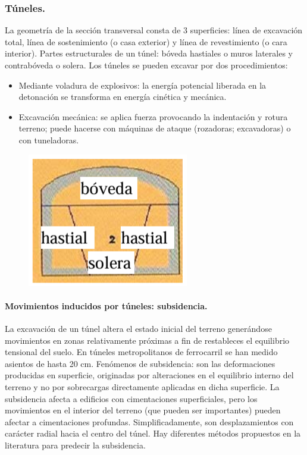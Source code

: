 \subsubsection{Túneles.}
La geometría de la sección transversal consta de 3 superficies: línea de excavación total, línea de sostenimiento (o casa exterior) y línea de revestimiento (o cara interior). Partes estructurales de un túnel: bóveda hastiales o muros laterales y contrabóveda o solera. Los túneles se pueden excavar por dos procedimientos:
\begin{itemize}
    \item Mediante voladura de explosivos: la energía potencial liberada en la detonación se transforma en energía cinética y mecánica.
    \item Excavación mecánica: se aplica fuerza provocando la indentación y rotura terreno; puede hacerse con máquinas de ataque (rozadoras; excavadoras) o con tuneladoras.
\end{itemize}

\begin{figure}[H]
    \centering
    \includegraphics[width=0.5\linewidth]{Imagenes/Tuneles.png}
\end{figure}

\paragraph{Movimientos inducidos por túneles: subsidencia.}
La excavación de un túnel altera el estado inicial del terreno generándose movimientos en zonas relativamente próximas a fin de restableces el equilibrio tensional del suelo. En túneles metropolitanos de ferrocarril se han medido asientos de hasta 20 cm.
Fenómenos de subsidencia: son las deformaciones producidas en superficie, originadas por alteraciones en el equilibrio interno del terreno y no por sobrecargas directamente aplicadas en dicha superficie. La subsidencia afecta a edificios con cimentaciones superficiales, pero los movimientos en el interior del terreno (que pueden ser importantes) pueden afectar a cimentaciones profundas. Simplificadamente, son desplazamientos con carácter radial hacia el centro del túnel. Hay diferentes métodos propuestos en la literatura para predecir la subsidencia.

